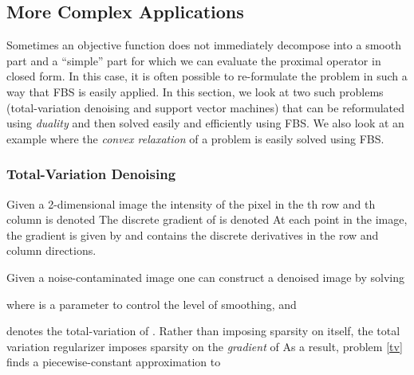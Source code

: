 \documentclass{amsart}
\newcommand{\half}{\frac{1}{2}}
\newcommand{\eqn}[2]{}
\DeclareMathOperator*{\minimize}{minimize\quad}
\theoremstyle{definition}
\begin{document}
\subsection{More Complex Applications}    
Sometimes an objective function does not immediately decompose into a smooth part and a ``simple'' part  for which we can evaluate the proximal operator in closed form.  In this case, it is often possible to re-formulate the problem in such a way that  FBS is easily applied.  In this section, we look at two such problems (total-variation denoising and support vector machines) that can be reformulated using {\em duality} and then solved easily and efficiently  using FBS.  We also look at an example where the {\em convex relaxation} of a problem is easily solved using FBS.

\subsubsection{Total-Variation Denoising} \label{sec:tv}
Given a 2-dimensional image  the intensity of the pixel in the th row and th column is denoted   The discrete gradient of  is denoted   At each point in the image, the gradient is given by  and contains the discrete derivatives in the row and column directions.

 Given a noise-contaminated image  one can construct a denoised image by solving
\eqn{tv}{
\minimize_u \mu |\nabla u| + \half \|u-f\|^2 
}
where  is a parameter to control the level of smoothing, and 
\eqn{tvdef}{
|\nabla u| =\sum_{i,j} \|(\nabla u)_{ij}\| =\sum_{i,j} \sqrt{ (u_{i+1,j}-u_{i,j})^2+(u_{i,j+1}-u_{i,j})^2}
} 
denotes the total-variation of  \cite{ROF92}.  Rather than imposing sparsity on  itself, the total variation regularizer imposes sparsity on the {\em gradient} of   As a result, problem \eqref{tv} finds a piecewise-constant approximation to 
\end{document}

